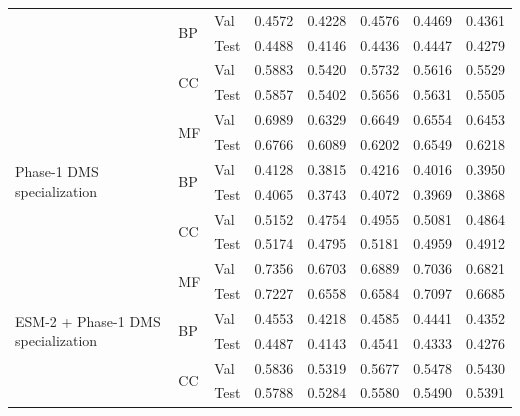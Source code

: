 \documentclass[11pt,a4paper]{article}
\begin{document}
\begin{table}[H]
\begin{tabular}{@{}l l l ccccc@{}}
\decaspectsep
 & \multirow{2}{*}{BP} & Val  & 0.4572 & 0.4228 & 0.4576 & 0.4469 & 0.4361 \\
 &  & Test & 0.4488 & 0.4146 & 0.4436 & 0.4447 & 0.4279 \\
\decaspectsep
 & \multirow{2}{*}{CC} & Val  & 0.5883 & 0.5420 & 0.5732 & 0.5616 & 0.5529 \\
 &  & Test & 0.5857 & 0.5402 & 0.5656 & 0.5631 & 0.5505 \\
\midrule
\multirow{6}{*}{\parbox{2.2cm}{\raggedright Phase-1 DMS specialization}}
 & \multirow{2}{*}{MF} & Val  & 0.6989 & 0.6329 & 0.6649 & 0.6554 & 0.6453 \\
 &  & Test & 0.6766 & 0.6089 & 0.6202 & 0.6549 & 0.6218 \\
\decaspectsep
 & \multirow{2}{*}{BP} & Val  & 0.4128 & 0.3815 & 0.4216 & 0.4016 & 0.3950 \\
 &  & Test & 0.4065 & 0.3743 & 0.4072 & 0.3969 & 0.3868 \\
\decaspectsep
 & \multirow{2}{*}{CC} & Val  & 0.5152 & 0.4754 & 0.4955 & 0.5081 & 0.4864 \\
 &  & Test & 0.5174 & 0.4795 & 0.5181 & 0.4959 & 0.4912 \\
\midrule
\multirow{6}{*}{\parbox{2.2cm}{\raggedright ESM-2 + Phase-1 DMS specialization}}
 & \multirow{2}{*}{MF} & Val  & 0.7356 & 0.6703 & 0.6889 & 0.7036 & 0.6821 \\
 &  & Test & 0.7227 & 0.6558 & 0.6584 & 0.7097 & 0.6685 \\
\decaspectsep
 & \multirow{2}{*}{BP} & Val  & 0.4553 & 0.4218 & 0.4585 & 0.4441 & 0.4352 \\
 &  & Test & 0.4487 & 0.4143 & 0.4541 & 0.4333 & 0.4276 \\
\decaspectsep
 & \multirow{2}{*}{CC} & Val  & 0.5836 & 0.5319 & 0.5677 & 0.5478 & 0.5430 \\
 &  & Test & 0.5788 & 0.5284 & 0.5580 & 0.5490 & 0.5391 \\
\bottomrule
\end{tabular}
\end{table}
\end{document}
